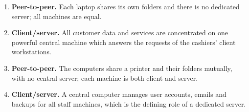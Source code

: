 \documentclass[11pt]{article}
\begin{document}
\begin{corrige}
\begin{enumerate}
\item \textbf{Peer-to-peer.} Each laptop shares its own folders and there is no dedicated server; all machines are equal.
\item \textbf{Client/server.} All customer data and services are concentrated on one powerful central machine which answers the requests of the cashiers' client workstations.
\item \textbf{Peer-to-peer.} The computers share a printer and their folders mutually, with no central server; each machine is both client and server.
\item \textbf{Client/server.} A central computer manages user accounts, emails and backups for all staff machines, which is the defining role of a dedicated server.
\end{enumerate}
\end{corrige}
\end{document}
